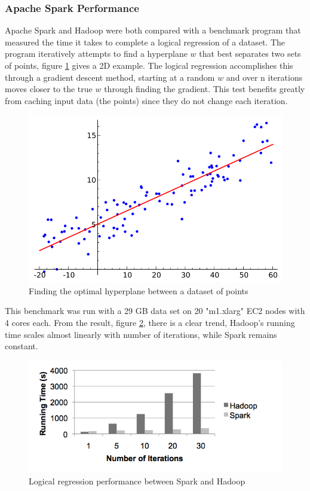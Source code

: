 \documentclass[10pt,twocolumn]{IEEEtran11}
\begin{document}
\subsubsection{Apache Spark Performance}
Apache Spark and Hadoop were both compared with a benchmark program that measured the time it takes to complete a logical regression of a dataset.  The program iteratively attempts to find a hyperplane $w$ that best separates two sets of points, figure \ref{fig:logicalRegression} gives a 2D example.   The logical regression accomplishes this through a gradient descent method, starting at a random $w$ and over n iterations moves closer to the true $w$ through finding the gradient.  This test benefits greatly from caching input data (the points) since they do not change each iteration.

\begin{figure}[h]
	\centering
	\includegraphics[scale=0.3]{images/logicalRegression.png}
	\caption{Finding the optimal hyperplane between a dataset of points}
	\label{fig:logicalRegression}
\end{figure}

This benchmark was run with a 29 GB data set on 20 "m1.xlarg" EC2 nodes with 4 cores each.  From the result, figure \ref{fig:sparkPerformance},  there is a clear trend, Hadoop's running time scales almost linearly with number of iterations, while Spark remains constant.

\begin{figure}[h]
	\centering
	\includegraphics[width = 10 cm]{images/sparkPerformance.png}
	\caption{Logical regression performance between Spark and Hadoop  \protect\cite{zaharia2010spark}}
	\label{fig:sparkPerformance}
\end{figure}
\end{document}
